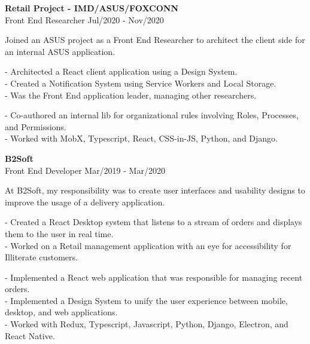 \documentclass[12pt]{article}
\newcommand{\jobentry}[3]{\textbf{#1} \\ #2 \hfill #3}
\begin{document}
\medskip

\jobentry{Retail Project - IMD/ASUS/FOXCONN}{Front End Researcher}{Jul/2020 - Nov/2020}

\smallskip

Joined an ASUS project as a Front End Researcher to architect the client side for an internal ASUS application.

\smallskip

\begin{paracol}{2}

    - Architected a React client application using a Design System. \\
    - Created a Notification System using Service Workers and Local Storage. \\
    - Was the Front End application leader, managing other researchers.
    
    \switchcolumn
    
    - Co-authored an internal lib for organizational rules involving Roles, Processes, and Permissions. \\
    - Worked with MobX, Typescript, React, CSS-in-JS, Python, and Django.

\end{paracol}

\medskip

\jobentry{B2Soft}{Front End Developer}{Mar/2019 - Mar/2020}

\smallskip

At B2Soft, my responsibility was to create user interfaces and usability designs to improve the usage of a delivery application.

\smallskip

\begin{paracol}{2}

    - Created a React Desktop system that listens to a stream of orders and displays them to the user in real time. \\
    - Worked on a Retail management application with an eye for accessibility for Illiterate customers. \\
    
    \switchcolumn
    
    - Implemented a React web application that was responsible for managing recent orders. \\
    - Implemented a Design System to unify the user experience between mobile, desktop, and web applications. \\
    - Worked with Redux, Typescript, Javascript, Python, Django, Electron, and React Native.

\end{paracol}
\end{document}
